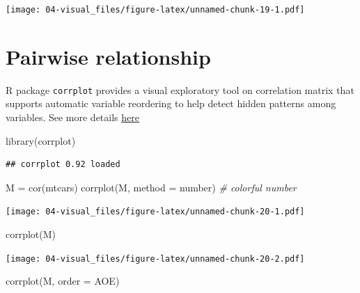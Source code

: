 \documentclass[
]{book}
\newenvironment{Shaded}{\begin{snugshade}}{\end{snugshade}}
\newcommand{\AttributeTok}[1]{\textcolor[rgb]{0.77,0.63,0.00}{#1}}
\newcommand{\CommentTok}[1]{\textcolor[rgb]{0.56,0.35,0.01}{\textit{#1}}}
\newcommand{\FunctionTok}[1]{\textcolor[rgb]{0.00,0.00,0.00}{#1}}
\newcommand{\NormalTok}[1]{#1}
\newcommand{\OtherTok}[1]{\textcolor[rgb]{0.56,0.35,0.01}{#1}}
\newcommand{\StringTok}[1]{\textcolor[rgb]{0.31,0.60,0.02}{#1}}
\theoremstyle{definition}
\theoremstyle{definition}
\theoremstyle{definition}
\theoremstyle{definition}
\theoremstyle{remark}
\begin{document}
\texttt{[image: 04-visual\_files/figure-latex/unnamed-chunk-19-1.pdf]}

\hypertarget{pairwise-relationship}{%
\section{Pairwise relationship}\label{pairwise-relationship}}

R package \texttt{corrplot} provides a visual exploratory tool on correlation matrix that supports automatic variable reordering to help detect hidden patterns among variables. See more details \href{https://cran.r-project.org/web/packages/corrplot/vignettes/corrplot-intro.html}{here}

\begin{Shaded}
\begin{Highlighting}[]
\FunctionTok{library}\NormalTok{(corrplot)}
\end{Highlighting}
\end{Shaded}

\begin{verbatim}
## corrplot 0.92 loaded
\end{verbatim}

\begin{Shaded}
\begin{Highlighting}[]
\NormalTok{M }\OtherTok{=} \FunctionTok{cor}\NormalTok{(mtcars)}
\FunctionTok{corrplot}\NormalTok{(M, }\AttributeTok{method =} \StringTok{\textquotesingle{}number\textquotesingle{}}\NormalTok{) }\CommentTok{\# colorful number}
\end{Highlighting}
\end{Shaded}

\texttt{[image: 04-visual\_files/figure-latex/unnamed-chunk-20-1.pdf]}

\begin{Shaded}
\begin{Highlighting}[]
\FunctionTok{corrplot}\NormalTok{(M)}
\end{Highlighting}
\end{Shaded}

\texttt{[image: 04-visual\_files/figure-latex/unnamed-chunk-20-2.pdf]}

\begin{Shaded}
\begin{Highlighting}[]
\FunctionTok{corrplot}\NormalTok{(M, }\AttributeTok{order =} \StringTok{\textquotesingle{}AOE\textquotesingle{}}\NormalTok{)}
\end{Highlighting}
\end{Shaded}
\end{document}
